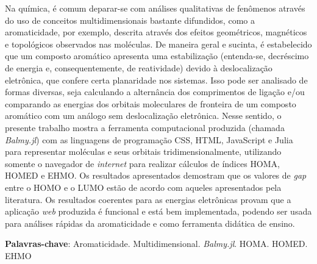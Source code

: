 
\setlength{\absparsep}{18pt} %
\begin{resumo}
	\SingleSpacing
    Na química, é comum deparar-se com análises qualitativas de fenômenos através do uso de conceitos multidimensionais bastante difundidos, como a aromaticidade, por exemplo, descrita através dos efeitos geométricos, magnéticos e topológicos observados nas moléculas. De maneira geral e sucinta, é estabelecido que um composto aromático apresenta uma estabilização (entenda-se, decréscimo de energia e, consequentemente, de reatividade) devido à deslocalização eletrônica, que confere certa planaridade nos sistemas. Isso pode ser analisado de formas diversas, seja calculando a alternância dos comprimentos de ligação e/ou comparando as energias dos orbitais moleculares de fronteira de um composto aromático com um análogo sem deslocalização eletrônica. Nesse sentido, o presente trabalho mostra a ferramenta computacional produzida (chamada \textit{Balmy.jl}) com as linguagens de programação \gls{CSS}, \gls{HTML}, JavaScript e Julia para representar moléculas e seus orbitais tridimensionalmente, utilizando somente o navegador de \textit{internet} para realizar cálculos de índices \gls{HOMA}, \gls{HOMED} e \gls{EHMO}. Os resultados apresentados demostram que os valores de \textit{gap} entre o \gls{HOMO} e o \gls{LUMO} estão de acordo com aqueles apresentados pela literatura. Os resultados coerentes para as energias eletrônicas provam que a aplicação \textit{web} produzida é funcional e está bem implementada, podendo ser usada para análises rápidas da aromaticidade e como ferramenta didática de ensino.
	
	\textbf{Palavras-chave}: Aromaticidade. Multidimensional. \textit{Balmy.jl}. \gls{HOMA}. \gls{HOMED}. \gls{EHMO}
\end{resumo}

